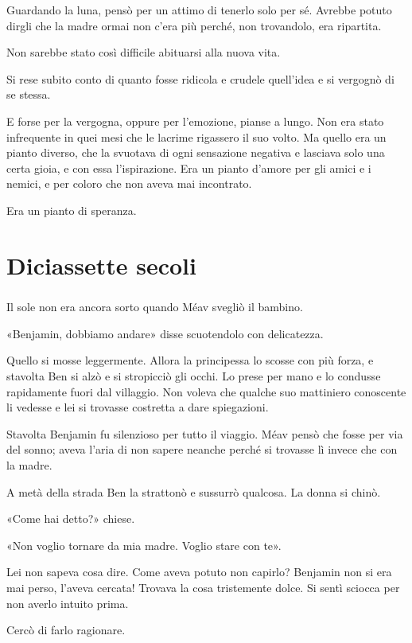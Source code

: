\documentclass[a4paper,12pt]{book}
\begin{document}
Guardando la luna, pensò per un attimo di tenerlo solo per sé. Avrebbe potuto
dirgli che la madre ormai non c'era più perché, non trovandolo, era ripartita.

Non sarebbe stato così difficile abituarsi alla nuova vita.

Si rese subito conto di quanto fosse ridicola e crudele quell'idea e si
vergognò di se stessa.

E forse per la vergogna, oppure per l'emozione, pianse a lungo. Non era stato
infrequente in quei mesi che le lacrime rigassero il suo volto. Ma quello era un
pianto diverso, che la svuotava di ogni sensazione negativa e lasciava solo una
certa gioia, e con essa l'ispirazione. Era un pianto d'amore per gli amici e i
nemici, e per coloro che non aveva mai incontrato.

Era un pianto di speranza.

\chapter{Diciassette secoli}

\paragraph{}
Il sole non era ancora sorto quando Méav svegliò il bambino.

«Benjamin, dobbiamo andare» disse scuotendolo con delicatezza.

Quello si mosse leggermente. Allora la principessa lo scosse con più forza, e
stavolta Ben si alzò e si stropicciò gli occhi. Lo prese per mano e lo
condusse rapidamente fuori dal villaggio. Non voleva che qualche suo mattiniero
conoscente li vedesse e lei si trovasse costretta a dare spiegazioni.

Stavolta Benjamin fu silenzioso per tutto il viaggio. Méav pensò che fosse per
via del sonno; aveva l'aria di non sapere neanche perché si trovasse lì invece
che con la madre.

A metà della strada Ben la strattonò e sussurrò qualcosa. La donna si chinò.

«Come hai detto?» chiese.

«Non voglio tornare da mia madre. Voglio stare con te».

Lei non sapeva cosa dire. Come aveva potuto non capirlo? Benjamin non si era mai
perso, l'aveva cercata! Trovava la cosa tristemente dolce. Si sentì sciocca per
non averlo intuito prima.

Cercò di farlo ragionare.
\end{document}
